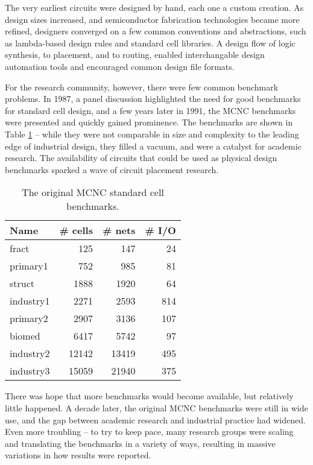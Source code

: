 \documentclass[sigconf]{acmart}
\begin{document}
The very earliest circuits were designed by hand, each one a custom
creation. As design sizes increased, and semiconductor fabrication
technologies became more refined, designers converged on a few
common conventions and abstractions, such as lambda-based design rules
and standard cell libraries\cite{Mead93}.  A design flow of logic
synthesis, to placement, and to routing, enabled interchangable
design automation tools and encouraged common design file formats.

For the research community, however, there were few common benchmark
problems.  In 1987, a panel discussion\cite{Preas87} highlighted the
need for good benchmarks for standard cell design, and a few years
later in 1991, the MCNC benchmarks\cite{Kozminski91} were presented
and quickly gained prominence.  The benchmarks are shown in Table
\ref{tab:mcnc} -- while they were not comparable in size and
complexity to the leading edge of industrial design, they filled a
vacuum, and were a catalyst for academic research.  The availability of
circuits that could be used as physical design benchmarks sparked a
wave of circuit placement research.

\begin{table}
  \begin{tabular}{|l|r|r|r|} \hline
Name & \# cells & \# nets & \# I/O \\ \hline
    fract   &   125 &   147 & 24 \\ \hline
   primary1 &   752 &   985 & 81 \\ \hline
    struct  &  1888 &  1920 & 64 \\ \hline
  industry1 &  2271 & 2593 & 814 \\ \hline
  primary2 & 2907 & 3136 & 107 \\ \hline
  biomed & 6417 & 5742 & 97 \\ \hline
  industry2 & 12142 & 13419 & 495 \\ \hline
  industry3 & 15059 & 21940 & 375 \\ \hline
  \end{tabular}
  \caption{The original MCNC standard cell
    benchmarks\cite{Kozminski91}.}\label{tab:mcnc}
\end{table}


There was hope that more benchmarks would
become available\cite{Kozminski91},
but relatively little happened.
A decade later, the original MCNC
benchmarks were still in wide use, and
the gap between academic research and
industrial practice had widened.
Even more troubling -- to try to keep pace, many research
groups were scaling and translating the benchmarks in
a variety of ways, resulting in massive variations in how
results were reported\cite{Madden010030}.
\end{document}
